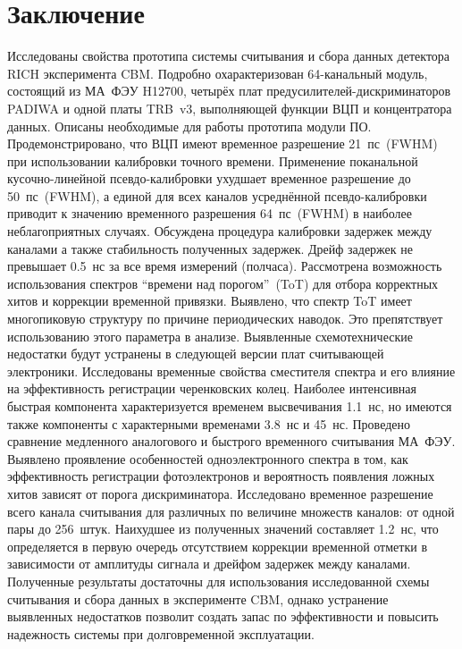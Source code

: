 \section*{Заключение}\label{sec:secSummary}

Исследованы свойства прототипа системы считывания и сбора данных детектора RICH эксперимента CBM. Подробно охарактеризован 64-канальный модуль, состоящий из МА~ФЭУ H12700, четырёх плат предусилителей-дискриминаторов PADIWA и одной платы TRB~v3, выполняющей функции ВЦП и концентратора данных. Описаны необходимые для работы прототипа модули ПО. Продемонстрировано, что ВЦП имеют временное разрешение 21~пс~(FWHM) при использовании калибровки точного времени. Применение поканальной кусочно-линейной псевдо-калибровки ухудшает временное разрешение до 50~пс~(FWHM), а единой для всех каналов усреднённой псевдо-калибровки приводит к значению временного разрешения 64~пс~(FWHM) в наиболее неблагоприятных случаях. Обсуждена процедура калибровки задержек между каналами а также стабильность полученных задержек. Дрейф задержек не превышает 0.5~нс за все время измерений (полчаса).
Рассмотрена возможность использования спектров ``времени над порогом''~(ToT) для отбора корректных хитов и коррекции временной привязки. Выявлено, что спектр ToT имеет многопиковую структуру по причине периодических наводок. Это препятствует использованию этого параметра в анализе. Выявленные схемотехнические недостатки будут устранены в следующей версии плат считывающей электроники. Исследованы временные свойства сместителя спектра и его влияние на эффективность регистрации черенковских колец. Наиболее интенсивная быстрая компонента характеризуется временем высвечивания 1.1~нс, но имеются также компоненты с характерными временами 3.8~нс и 45~нс. Проведено сравнение медленного аналогового и быстрого временного считывания МА~ФЭУ. Выявлено проявление особенностей одноэлектронного спектра в том, как эффективность регистрации фотоэлектронов и вероятность появления ложных хитов зависят от порога дискриминатора. Исследовано временное разрешение всего канала считывания для различных по величине множеств каналов: от одной пары до 256~штук. Наихудшее из полученных значений составляет 1.2~нс, что определяется в первую очередь отсутствием коррекции временной отметки в зависимости от амплитуды сигнала и дрейфом задержек между каналами. Полученные результаты достаточны для использования исследованной схемы считывания и сбора данных в эксперименте CBM, однако устранение выявленных недостатков позволит создать запас по эффективности и повысить надежность системы при долговременной эксплуатации.

